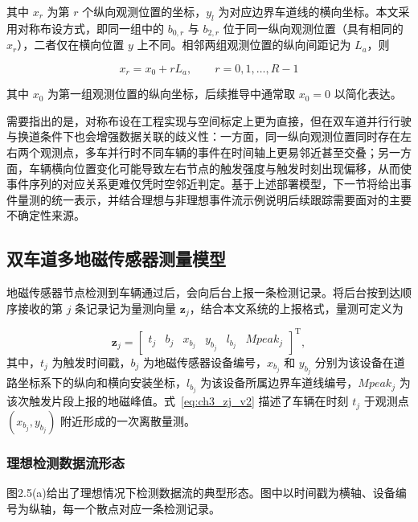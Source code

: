 \documentclass{xdupgthesis}
\begin{document}
其中 $x_r$ 为第 $r$ 个纵向观测位置的坐标，$y_l$ 为对应边界车道线的横向坐标。本文采用对称布设方式，即同一组中的 $b_{0,r}$ 与 $b_{2,r}$ 位于同一纵向观测位置（具有相同的 $x_r$），二者仅在横向位置 $y$ 上不同。相邻两组观测位置的纵向间距记为 $L_a$，则

\begin{equation}
	x_r = x_0 + rL_a,
	\qquad r=0,1,\ldots,R-1
	\tag{2-5}
\end{equation}

其中 $x_0$ 为第一组观测位置的纵向坐标，后续推导中通常取 $x_0=0$ 以简化表达。

需要指出的是，对称布设在工程实现与空间标定上更为直接，但在双车道并行行驶与换道条件下也会增强数据关联的歧义性：一方面，同一纵向观测位置同时存在左右两个观测点，多车并行时不同车辆的事件在时间轴上更易邻近甚至交叠；另一方面，车辆横向位置变化可能导致左右节点的触发强度与触发时刻出现偏移，从而使事件序列的对应关系更难仅凭时空邻近判定。基于上述部署模型，下一节将给出事件量测的统一表示，并结合理想与非理想事件流示例说明后续跟踪需要面对的主要不确定性来源。

\subsection{双车道多地磁传感器测量模型}

地磁传感器节点检测到车辆通过后，会向后台上报一条检测记录。将后台按到达顺序接收的第 $j$ 条记录记为量测向量 $\mathbf z_j$，结合本文系统的上报格式，量测可定义为

\begin{equation}
	\mathbf z_j=
	\begin{bmatrix}
		t_j &
		b_j &
		x_{b_j} &
		y_{b_j} &
		l_{b_j} &
		Mpeak_j
	\end{bmatrix}^{\mathrm T},
	\label{eq:ch3_zj_v2}
\end{equation}
其中，$t_j$ 为触发时间戳，$b_j$ 为地磁传感器设备编号，$x_{b_j}$ 和 $y_{b_j}$ 分别为该设备在道路坐标系下的纵向和横向安装坐标，$l_{b_j}$ 为该设备所属边界车道线编号，$Mpeak_j$ 为该次触发片段上报的地磁峰值。式~\eqref{eq:ch3_zj_v2} 描述了车辆在时刻 $t_j$ 于观测点 $(x_{b_j},y_{b_j})$ 附近形成的一次离散量测。

\subsubsection{ 理想检测数据流形态}


图2.5(a)给出了理想情况下检测数据流的典型形态。图中以时间戳为横轴、设备编号为纵轴，每一个散点对应一条检测记录。
\end{document}
